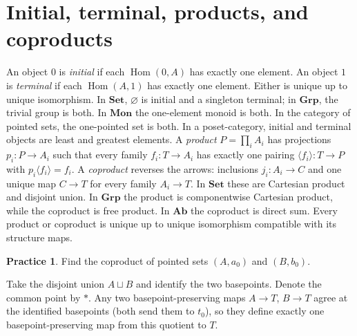 \documentclass[11pt,openany]{book}
\newcommand{\Hom}{\operatorname{Hom}}\newcommand{\Aut}{\operatorname{Aut}}
\theoremstyle{definition}
\newtheorem{exercise}[theorem]{Practice}
\begin{document}
\section{Initial, terminal, products, and coproducts}
An object $0$ is \emph{initial} if each $\Hom(0,A)$ has exactly one element. An object $1$ is \emph{terminal} if each $\Hom(A,1)$ has exactly one element. Either is unique up to unique isomorphism. In $\mathbf{Set}$, $\varnothing$ is initial and a singleton terminal; in $\mathbf{Grp}$, the trivial group is both. In $\mathbf{Mon}$ the one-element monoid is both. In the category of pointed sets, the one-pointed set is both. In a poset-category, initial and terminal objects are least and greatest elements.
A \emph{product} $P=\prod_i A_i$ has projections $p_i:P\to A_i$ such that every family $f_i:T\to A_i$ has exactly one pairing $\langle f_i\rangle:T\to P$ with $p_i\langle f_i\rangle=f_i$. A \emph{coproduct} reverses the arrows: inclusions $j_i:A_i\to C$ and one unique map $C\to T$ for every family $A_i\to T$. In $\mathbf{Set}$ these are Cartesian product and disjoint union. In $\mathbf{Grp}$ the product is componentwise Cartesian product, while the coproduct is free product. In $\mathbf{Ab}$ the coproduct is direct sum. Every product or coproduct is unique up to unique isomorphism compatible with its structure maps.
\begin{exercise}Find the coproduct of pointed sets $(A,a_0)$ and $(B,b_0)$.\end{exercise}
\begin{solution}Take the disjoint union $A\sqcup B$ and identify the two basepoints. Denote the common point by $*$. Any two basepoint-preserving maps $A\to T$, $B\to T$ agree at the identified basepoints (both send them to $t_0$), so they define exactly one basepoint-preserving map from this quotient to $T$.\end{solution}
\end{document}

